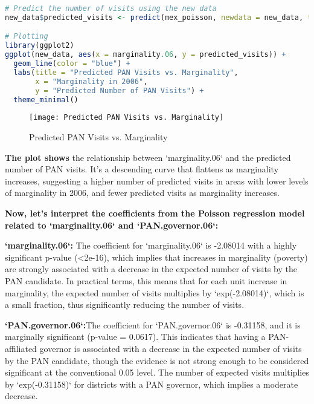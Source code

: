 \documentclass[12pt,letterpaper]{article}
\begin{document}
\begin{enumerate}
\begin{lstlisting}[language=R]
# Predict the number of visits using the new data
new_data$predicted_visits <- predict(mex_poisson, newdata = new_data, type = "response")

# Plotting
library(ggplot2)
ggplot(new_data, aes(x = marginality.06, y = predicted_visits)) +
  geom_line(color = "blue") +
  labs(title = "Predicted PAN Visits vs. Marginality",
       x = "Marginality in 2006",
       y = "Predicted Number of PAN Visits") +
  theme_minimal()
\end{lstlisting}
\begin{figure}[H]
\centering
\texttt{[image: Predicted PAN Visits vs. Marginality]}
\caption{Predicted PAN Visits vs. Marginality}
\end{figure}

\textbf{The plot shows }the relationship between `marginality.06` and the predicted number of PAN visits. It’s a descending curve that flattens as marginality increases, suggesting a higher number of predicted visits in areas with lower levels of marginality in 2006, and fewer predicted visits as marginality increases.

\textbf{Now, let's interpret the coefficients from the Poisson regression model related to `marginality.06` and `PAN.governor.06`:}

\textbf{`marginality.06`: }The coefficient for `marginality.06` is -2.08014 with a highly significant p-value (<2e-16), which implies that increases in marginality (poverty) are strongly associated with a decrease in the expected number of visits by the PAN candidate. In practical terms, this means that for each unit increase in marginality, the expected number of visits multiplies by `exp(-2.08014)`, which is a small fraction, thus significantly reducing the number of visits.

\textbf{`PAN.governor.06`:}The coefficient for `PAN.governor.06` is -0.31158, and it is marginally significant (p-value = 0.0617). This indicates that having a PAN-affiliated governor is associated with a decrease in the expected number of visits by the PAN candidate, though the evidence is not strong enough to be considered significant at the conventional 0.05 level. The number of expected visits multiplies by `exp(-0.31158)` for districts with a PAN governor, which implies a moderate decrease.


\end{enumerate}
\end{document}

